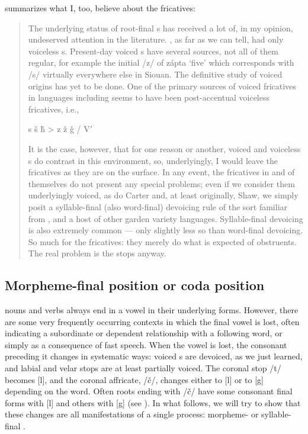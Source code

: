 \documentclass[output=paper]{LSP/langsci}
\begin{document}
\citet[4]{Rankin2001} summarizes what I, too, believe about the fricatives:

\begin{quote}The underlying status of  root-final s has received a lot of, in my opinion, undeserved attention in the literature. , as far as we can tell, had only voiceless s. Present-day voiced s have several sources, not all of them regular, for example the initial /z/ of zápta `five' which corresponds with /s/ virtually everywhere else in Siouan. The definitive study of voiced  origins has yet to be done. One of the primary sources of voiced fricatives in  languages including  seems to have been post-accentual voiceless fricatives, i.e.,\vspace{-1em}
\begin{center}
s \v{s} \v{h} > z \v{z} \v{g} / V$'$  \underline{\hspace{1em}}
\end{center}
\vspace{-1em}
It is the case, however, that for one reason or another, voiced and voiceless s do contrast in this environment, so, underlyingly, I would leave the fricatives as they are on the surface. In any event, the fricatives in and of themselves do not present any special problems; even if we consider them underlyingly voiced, as do Carter and, at least originally, Shaw, we simply posit a syllable-final (also word-final) devoicing rule of the sort familiar from ,  and a host of other garden variety languages. Syllable-final devoicing is also extremely common --- only slightly less so than word-final devoicing. So much for the fricatives: they merely do what is expected of obstruents. The real problem is the stops anyway.\end{quote}

\subsection{Morpheme-final position or coda position}

 nouns and verbs always end in a vowel in their underlying forms. However, there are some very frequently occurring contexts in which the final vowel is lost, often indicating a subordinate or dependent relationship with a following word, or simply as a consequence of fast speech. When the vowel is lost, the consonant preceding it changes in systematic ways: voiced s are devoiced, as we just learned, and labial and velar stops are at least partially voiced. The coronal stop /t/ becomes [l], and the coronal affricate, /\v{c}/, changes either to [l] or to [g] depending on the word. Often roots ending with /\v{c}/ have some consonant final forms with [l] and others with [g] (see ). In what follows, we will try to show that these changes are all manifestations of a single process: morpheme- or syllable-final .
\end{document}
